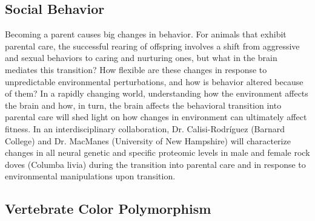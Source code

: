 \documentclass[10.5pt]{article}
\begin{document}
{\subsection*{Social Behavior}


\noindent
Becoming a parent causes big changes in behavior. For animals that exhibit parental care, the successful rearing of offspring involves a shift from aggressive and sexual behaviors to caring and nurturing ones, but what in the brain mediates this transition? How flexible are these changes in response to unpredictable environmental perturbations, and how is behavior altered because of them? In a rapidly changing world, understanding how the environment affects the brain and how, in turn, the brain affects the behavioral transition into parental care will shed light on how changes in environment can ultimately affect fitness. In an interdisciplinary collaboration, Dr. Calisi-Rodríguez (Barnard College) and Dr. MacManes (University of New Hampshire) will characterize changes in all neural genetic and specific proteomic levels in male and female rock doves (Columba livia) during the transition into parental care and in response to environmental manipulations upon transition.  \\

\subsection*{Vertebrate Color Polymorphism}


}
\end{document}

